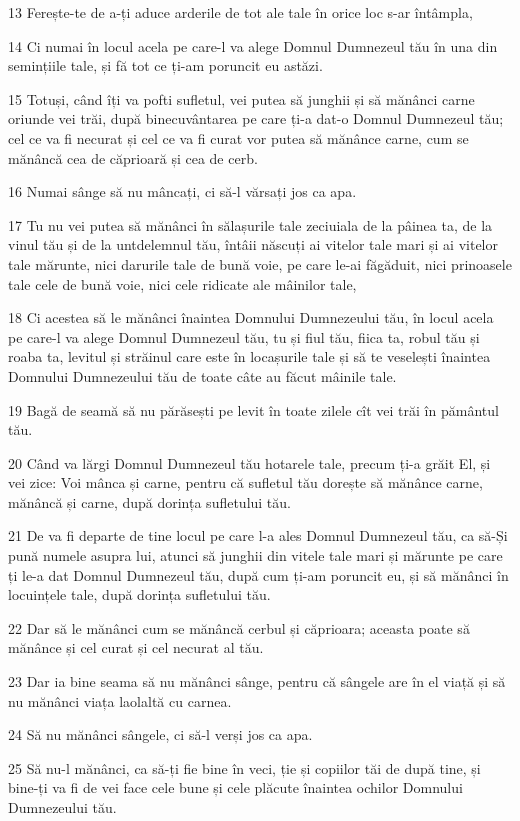 \par 13 Ferește-te de a-ți aduce arderile de tot ale tale în orice loc s-ar întâmpla,
\par 14 Ci numai în locul acela pe care-l va alege Domnul Dumnezeul tău în una din semințiile tale, și fă tot ce ți-am poruncit eu astăzi.
\par 15 Totuși, când îți va pofti sufletul, vei putea să junghii și să mănânci carne oriunde vei trăi, după binecuvântarea pe care ți-a dat-o Domnul Dumnezeul tău; cel ce va fi necurat și cel ce va fi curat vor putea să mănânce carne, cum se mănâncă cea de căprioară și cea de cerb.
\par 16 Numai sânge să nu mâncați, ci să-l vărsați jos ca apa.
\par 17 Tu nu vei putea să mănânci în sălașurile tale zeciuiala de la pâinea ta, de la vinul tău și de la untdelemnul tău, întâii născuți ai vitelor tale mari și ai vitelor tale mărunte, nici darurile tale de bună voie, pe care le-ai făgăduit, nici prinoasele tale cele de bună voie, nici cele ridicate ale mâinilor tale,
\par 18 Ci acestea să le mănânci înaintea Domnului Dumnezeului tău, în locul acela pe care-l va alege Domnul Dumnezeul tău, tu și fiul tău, fiica ta, robul tău și roaba ta, levitul și străinul care este în locașurile tale și să te veselești înaintea Domnului Dumnezeului tău de toate câte au făcut mâinile tale.
\par 19 Bagă de seamă să nu părăsești pe levit în toate zilele cît vei trăi în pământul tău.
\par 20 Când va lărgi Domnul Dumnezeul tău hotarele tale, precum ți-a grăit El, și vei zice: Voi mânca și carne, pentru că sufletul tău dorește să mănânce carne, mănâncă și carne, după dorința sufletului tău.
\par 21 De va fi departe de tine locul pe care l-a ales Domnul Dumnezeul tău, ca să-Și pună numele asupra lui, atunci să junghii din vitele tale mari și mărunte pe care ți le-a dat Domnul Dumnezeul tău, după cum ți-am poruncit eu, și să mănânci în locuințele tale, după dorința sufletului tău.
\par 22 Dar să le mănânci cum se mănâncă cerbul și căprioara; aceasta poate să mănânce și cel curat și cel necurat al tău.
\par 23 Dar ia bine seama să nu mănânci sânge, pentru că sângele are în el viață și să nu mănânci viața laolaltă cu carnea.
\par 24 Să nu mănânci sângele, ci să-l verși jos ca apa.
\par 25 Să nu-l mănânci, ca să-ți fie bine în veci, ție și copiilor tăi de după tine, și bine-ți va fi de vei face cele bune și cele plăcute înaintea ochilor Domnului Dumnezeului tău.
